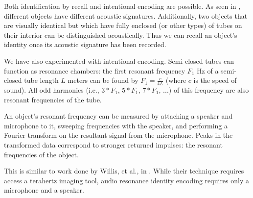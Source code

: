 
Both identification by recall and intentional encoding are possible.  As seen in \cite{Ono-touchandactivate}, different objects have different acoustic signatures.  Additionally, two objects that are visually identical but which have fully enclosed (or other types) of tubes on their interior can be distinguished acoustically.  Thus we can recall an object's identity once its acoustic signature has been recorded.

We have also experimented with intentional encoding.  Semi-closed tubes can function as resonance chambers: the first resonant frequency $F_1$ Hz of a semi-closed tube length $L$ meters can be found by $F_1 = \frac{c}{4L}$ (where $c$ is the speed of sound).  All odd harmonics (i.e., $3*F_1$, $5*F_1$, $7*F_1$, ...) of this frequency are also resonant frequencies of the tube. 

An object's resonant frequency can be measured by attaching a speaker and microphone to it, sweeping frequencies with the speaker, and performing a Fourier transform on the resultant signal from the microphone.  Peaks in the transformed data correspond to stronger returned impulses: the resonant frequencies of the object.

This is similar to work done by Willis, et al., in \cite{Willis-infrastructs}.  While their technique requires access a terahertz imaging tool, audio resonance identity encoding requires only a microphone and a speaker.

